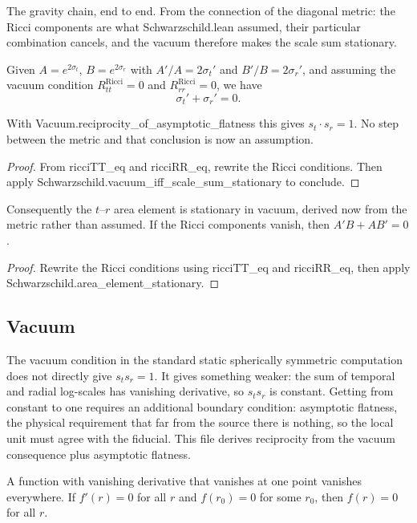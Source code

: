 \begin{theorem}
The gravity chain, end to end. From the connection of the diagonal metric: the Ricci components are what Schwarzschild.lean assumed, their particular combination cancels, and the vacuum therefore makes the scale sum stationary.

Given $A = e^{2\sigma_t}$, $B = e^{2\sigma_r}$ with $A' / A = 2\sigma_t'$ and $B' / B = 2\sigma_r'$, and assuming the vacuum condition $R^{\text{Ricci}}_{tt} = 0$ and $R^{\text{Ricci}}_{rr} = 0$, we have
$$\sigma_t' + \sigma_r' = 0.$$

With Vacuum.reciprocity\_of\_asymptotic\_flatness this gives $s_t \cdot s_r = 1$. No step between the metric and that conclusion is now an assumption. 
\end{theorem}

\begin{proof}
From ricciTT\_eq and ricciRR\_eq, rewrite the Ricci conditions. Then apply Schwarzschild.vacuum\_iff\_scale\_sum\_stationary to conclude.
\end{proof}

\begin{theorem}
Consequently the $t$--$r$ area element is stationary in vacuum, derived now from the metric rather than assumed. If the Ricci components vanish, then $A'B + AB' = 0$. 
\end{theorem}

\begin{proof}
Rewrite the Ricci conditions using ricciTT\_eq and ricciRR\_eq, then apply Schwarzschild.area\_element\_stationary.
\end{proof}

\subsection{Vacuum}

The vacuum condition in the standard static spherically symmetric computation does not directly give $s_t s_r = 1$. It gives something weaker: the sum of temporal and radial log-scales has vanishing derivative, so $s_t s_r$ is constant. Getting from constant to one requires an additional boundary condition: asymptotic flatness, the physical requirement that far from the source there is nothing, so the local unit must agree with the fiducial. This file derives reciprocity from the vacuum consequence plus asymptotic flatness.

\begin{theorem}
A function with vanishing derivative that vanishes at one point vanishes everywhere. If $f'(r) = 0$ for all $r$ and $f(r_0) = 0$ for some $r_0$, then $f(r) = 0$ for all $r$. 
\end{theorem}

